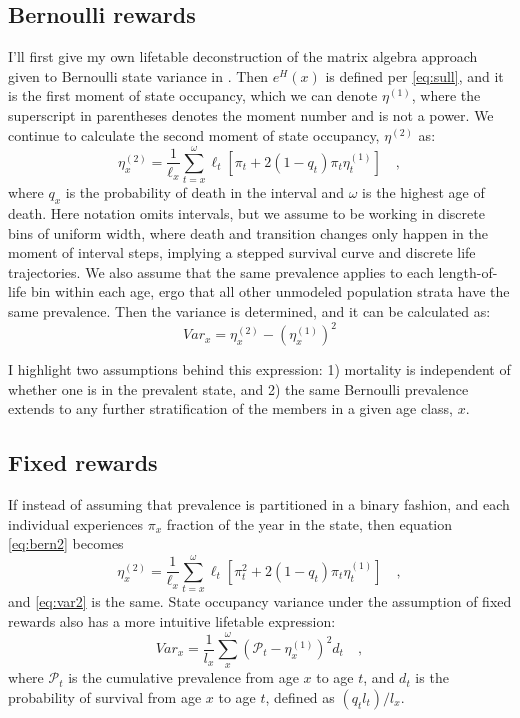 \documentclass{bmcart}
\begin{document}
\subsection*{Bernoulli rewards}
I'll first give my own lifetable deconstruction of the matrix algebra approach given to Bernoulli state variance in \cite{caswell2018matrix}. Then $e^H(x)$ is defined per \eqref{eq:sull}, and it is the first moment of state occupancy, which we can denote $\eta^{(1)}$, where the superscript in parentheses denotes the moment number and is not a power. We continue to calculate the second moment of state occupancy, $\eta^{(2)}$ as:
\begin{equation}
\label{eq:bern2}
\eta^{(2)}_x = \frac{1}{\ell_x} \sum_{t=x}^\omega \ell_t\left[\pi_t + 2(1-q_t)\pi_t\eta^{(1)}_t\right] \quad \mathrm{,}
\end{equation}
where $q_x$ is the probability of death in the interval and $\omega$ is the highest age of death. Here notation omits intervals, but we assume to be working in discrete bins of uniform width, where death and transition changes only happen in the moment of interval steps, implying a stepped survival curve and discrete life trajectories. We also assume that the same prevalence applies to each length-of-life bin within each age, ergo that all other unmodeled population strata have the same prevalence. Then the variance is determined, and it can be calculated as:
\begin{equation}
\label{eq:var2}
Var_x = \eta^{(2)}_x - (\eta^{(1)}_x)^2
\end{equation}

I highlight two assumptions behind this expression: 1) mortality is independent of whether one is in the prevalent state, and 2) the same Bernoulli prevalence extends to any further stratification of the members in a given age class, $x$.

\subsection*{Fixed rewards}
If instead of assuming that prevalence is partitioned in a binary fashion, and each individual experiences $\pi_x$ fraction of the year in the state, then equation \eqref{eq:bern2} becomes
\begin{equation}
\eta^{(2)}_x = \frac{1}{\ell_x} \sum_{t=x}^\omega \ell_t\left[\pi_t^2 + 2(1-q_t)\pi_t\eta^{(1)}_t\right] \quad \mathrm{,}
\end{equation}
and \eqref{eq:var2} is the same. State occupancy variance under the assumption of fixed rewards also has a more intuitive lifetable expression:
\begin{equation}
\label{eq:varbernlt}
Var_x = \frac{1}{l_x}\sum_x^\omega (\mathcal{P}_t - \eta^{(1)}_x)^2 d_t \quad\mathrm{,}
\end{equation}
where $\mathcal{P}_t$ is the cumulative prevalence from age $x$ to age $t$, and $d_t$ is the probability of survival from age $x$ to age $t$, defined as $(q_t l_t)/l_x$. 
\end{document}
